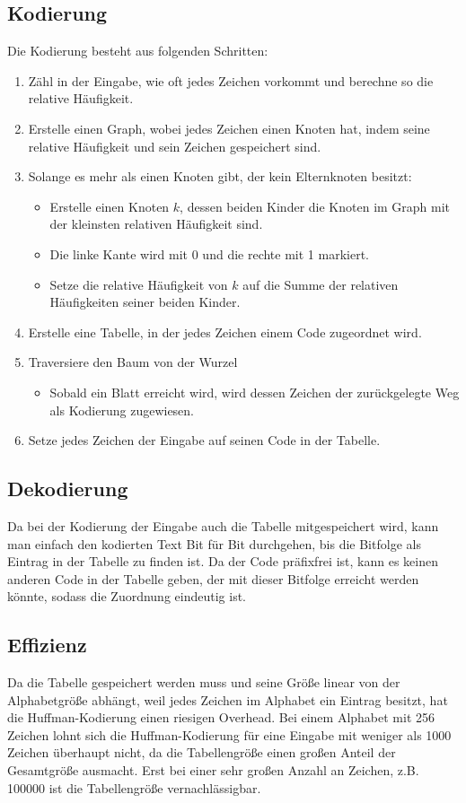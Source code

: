 \documentclass{article}
\begin{document}
\subsection{Kodierung}
Die Kodierung besteht aus folgenden Schritten:
\begin{enumerate}
    \item Zähl in der Eingabe, wie oft jedes Zeichen vorkommt und berechne so die relative Häufigkeit.
    \item Erstelle einen Graph, wobei jedes Zeichen einen Knoten hat, indem seine relative Häufigkeit und sein Zeichen gespeichert sind.
    \item Solange es mehr als einen Knoten gibt, der kein Elternknoten besitzt: 
        \begin{itemize}
            \item Erstelle einen Knoten $k$, dessen beiden Kinder die Knoten im Graph mit der 
            kleinsten relativen Häufigkeit sind.
            \item Die linke Kante wird mit 0 und die rechte mit 1 markiert.
            \item Setze die relative Häufigkeit von $k$ auf die Summe der relativen Häufigkeiten seiner beiden Kinder.
        \end{itemize} 
    \item Erstelle eine Tabelle, in der jedes Zeichen einem Code zugeordnet wird.    
    \item Traversiere den Baum von der Wurzel
        \begin{itemize}
            \item Sobald ein Blatt erreicht wird, wird dessen Zeichen der zurückgelegte Weg als Kodierung zugewiesen.
        \end{itemize}
    \item Setze jedes Zeichen der Eingabe auf seinen Code in der Tabelle.
\end{enumerate}
\subsection{Dekodierung}
Da bei der Kodierung der Eingabe auch die Tabelle mitgespeichert wird, kann man einfach den 
kodierten Text Bit für Bit durchgehen, bis die Bitfolge als Eintrag in der Tabelle zu finden ist.
Da der Code präfixfrei ist, kann es keinen anderen Code in der Tabelle geben, der mit dieser
Bitfolge erreicht werden könnte, sodass die Zuordnung eindeutig ist.
\subsection{Effizienz}
Da die Tabelle gespeichert werden muss und seine Größe linear von der Alphabetgröße abhängt,
weil jedes Zeichen im Alphabet ein Eintrag besitzt, hat die Huffman-Kodierung einen riesigen
Overhead. Bei einem Alphabet mit 256 Zeichen lohnt sich die Huffman-Kodierung für eine 
Eingabe mit weniger als 1000 Zeichen überhaupt nicht, da die Tabellengröße einen großen 
Anteil der Gesamtgröße ausmacht.
Erst bei einer sehr großen Anzahl an Zeichen, z.B. 100000 ist die Tabellengröße 
vernachlässigbar. 
\end{document}
